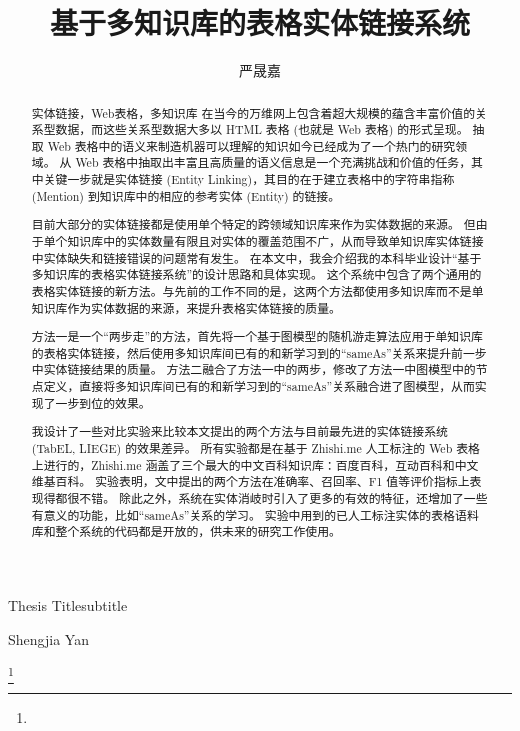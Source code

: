 \documentclass[bachelor]{seuthesis} %
\begin{document}

\title{基于多知识库的表格实体链接系统}{}{Thesis Title}{subtitle}
\author{严晟嘉}{Shengjia Yan}

\address{东南大学九龙湖校区}
\thanks{}
\maketitle

\begin{abstract}{实体链接，Web表格，多知识库}
在当今的万维网上包含着超大规模的蕴含丰富价值的关系型数据，而这些关系型数据大多以 HTML 表格 (也就是 Web 表格) 的形式呈现。
抽取 Web 表格中的语义来制造机器可以理解的知识如今已经成为了一个热门的研究领域。
从 Web 表格中抽取出丰富且高质量的语义信息是一个充满挑战和价值的任务，其中关键一步就是实体链接 (Entity Linking)，其目的在于建立表格中的字符串指称 (Mention) 到知识库中的相应的参考实体 (Entity) 的链接。\par

目前大部分的实体链接都是使用单个特定的跨领域知识库来作为实体数据的来源。
但由于单个知识库中的实体数量有限且对实体的覆盖范围不广，从而导致单知识库实体链接中实体缺失和链接错误的问题常有发生。
在本文中，我会介绍我的本科毕业设计``基于多知识库的表格实体链接系统''的设计思路和具体实现。
这个系统中包含了两个通用的表格实体链接的新方法。与先前的工作不同的是，这两个方法都使用多知识库而不是单知识库作为实体数据的来源，来提升表格实体链接的质量。\par

方法一是一个``两步走''的方法，首先将一个基于图模型的随机游走算法应用于单知识库的表格实体链接，然后使用多知识库间已有的和新学习到的``sameAs''关系来提升前一步中实体链接结果的质量。
方法二融合了方法一中的两步，修改了方法一中图模型中的节点定义，直接将多知识库间已有的和新学习到的``sameAs''关系融合进了图模型，从而实现了一步到位的效果。\par

我设计了一些对比实验来比较本文提出的两个方法与目前最先进的实体链接系统 (TabEL, LIEGE) 的效果差异。
所有实验都是在基于 Zhishi.me 人工标注的 Web 表格上进行的，Zhishi.me 涵盖了三个最大的中文百科知识库：百度百科，互动百科和中文维基百科。
实验表明，文中提出的两个方法在准确率、召回率、F1 值等评价指标上表现得都很不错。
除此之外，系统在实体消岐时引入了更多的有效的特征，还增加了一些有意义的功能，比如``sameAs''关系的学习。
实验中用到的已人工标注实体的表格语料库和整个系统的代码都是开放的，供未来的研究工作使用。
\end{abstract}
\end{document}
